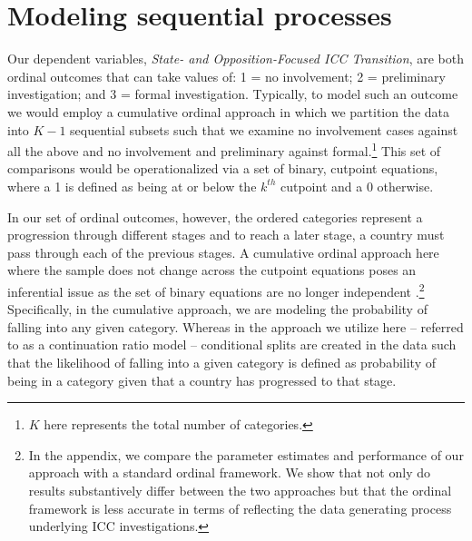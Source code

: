 
\section*{Modeling sequential processes}

Our dependent variables, \emph{State- and Opposition-Focused ICC Transition}, are both ordinal outcomes that can take values of: 1 = no involvement; 2 = preliminary investigation; and 3 = formal investigation. Typically, to model such an outcome we would employ a cumulative ordinal approach in which we partition the data into $K-1$ sequential subsets such that we examine no involvement cases against all the above and no involvement and preliminary against formal.\footnote{$K$ here represents the total number of categories.} This set of comparisons would be operationalized via a set of binary, cutpoint equations, where a 1 is defined as being at or below the $k^{th}$ cutpoint and a 0 otherwise. %

In our set of ordinal outcomes, however, the ordered categories represent a progression through different stages and to reach a later stage, a country must pass through each of the previous stages. A cumulative ordinal approach here where the sample does not change across the cutpoint equations poses an inferential issue as the set of binary equations are no longer independent \citep{tutz1990sequential, have:uttal:1994, fienberg2007analysis, agresti:2010}.\footnote{In the appendix, we compare the parameter estimates and performance of our approach with a standard ordinal framework. We show that not only do results substantively differ between the two approaches but that the ordinal framework is less accurate in terms of reflecting the data generating process underlying ICC investigations.} Specifically, in the cumulative approach, we are modeling the probability of falling into any given category. Whereas in the approach we utilize here -- referred to as a continuation ratio model -- conditional splits are created in the data such that the likelihood of falling into a given category is defined as probability of being in a category given that a country has progressed to that stage.

